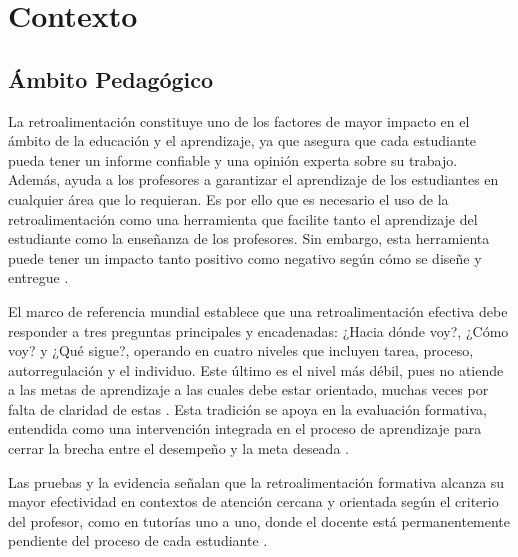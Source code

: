 \documentclass[letterpaper, 10 pt, conference]{ieeeconf}
\begin{document}



\section{Contexto} 

\subsection{Ámbito Pedagógico}  

La retroalimentación constituye uno de los factores de mayor impacto en el ámbito de la educación y el aprendizaje, ya que asegura que cada estudiante pueda tener un informe confiable y una opinión experta sobre su trabajo. Además, ayuda a los profesores a garantizar el aprendizaje de los estudiantes en cualquier área que lo requieran. Es por ello que es necesario el uso de la retroalimentación como una herramienta que facilite tanto el aprendizaje del estudiante como la enseñanza de los profesores. Sin embargo, esta herramienta puede tener un impacto tanto positivo como negativo según cómo se diseñe y entregue \cite{1}. 

El marco de referencia mundial establece que una retroalimentación efectiva debe responder a tres preguntas principales y encadenadas: ¿Hacia dónde voy?, ¿Cómo voy? y ¿Qué sigue?, operando en cuatro niveles que incluyen tarea, proceso, autorregulación y el individuo. Este último es el nivel más débil, pues no atiende a las metas de aprendizaje a las cuales debe estar orientado, muchas veces por falta de claridad de estas \cite{5}. Esta tradición se apoya en la evaluación formativa, entendida como una intervención integrada en el proceso de aprendizaje para cerrar la brecha entre el desempeño y la meta deseada \cite{5}\cite{6}. 

Las pruebas y la evidencia señalan que la retroalimentación formativa alcanza su mayor efectividad en contextos de atención cercana y orientada según el criterio del profesor, como en tutorías uno a uno, donde el docente está permanentemente pendiente del proceso de cada estudiante \cite{7}. 
\end{document}
